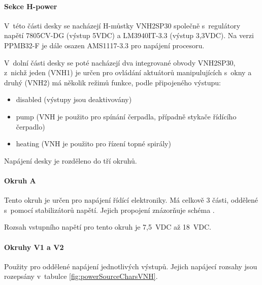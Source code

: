 \paragraph{Sekce H-power}
V~této části desky se nacházejí H-můstky VNH2SP30 společně s~regulátory napětí 7805CV-DG (výstup 5VDC) a LM3940IT-3.3 (výstup 3,3VDC). 
Na verzi PPMB32-F je dále osazen AMS1117-3.3 pro napájení procesoru. 

V~dolní části desky se poté nacházejí dva integrované obvody VNH2SP30, z~nichž jeden (VNH1) je určen pro ovládání aktuátorů manipulujících s~okny a druhý 
(VNH2) má několik režimů funkce, podle připojeného výstupu:
\begin{itemize}
    \item disabled (výstupy jsou deaktivovány)
    \item pump (VNH je použito pro spínání čerpadla, případně stykače řídícího čerpadlo)
    \item heating (VNH je použito pro řízení topné spirály)
\end{itemize}

Napájení desky je rozděleno do tří okruhů. 

\paragraph{Okruh A}
\label{par:PowerCircuitA}
Tento okruh je určen pro napájení řídící elektroniky.
Má celkově 3 části, oddělené s~pomocí stabilizátorů napětí.
Jejich propojení znázorňuje schéma .

Rozsah vstupního napětí pro tento okruh je 7,5~VDC až 18~VDC.

\paragraph{Okruhy V1 a V2}
Použity pro oddělené napájení jednotlivých výstupů. 
Jejich napájecí rozsahy jsou rozepsány v~tabulce \ref{fig:powerSourceCharsVNH}.

